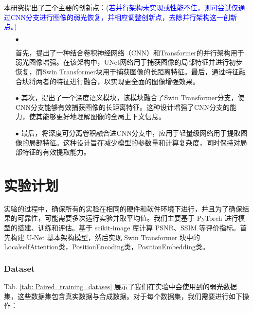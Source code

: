 \documentclass[a4paper, 10pt]{article}
\begin{document}
		本研究提出了三个主要的创新点：(\textcolor{blue}{若并行架构未实现或性能不佳，则可尝试仅通过CNN分支进行图像的弱光恢复，并相应调整创新点，去除并行架构这一创新点。})
		\begin{itemize}
			\item[$\bullet$]
			
			首先，提出了一种结合卷积神经网络（CNN）和Transformer的并行架构用于弱光图像增强。在该架构中，UNet网络用于捕获图像的局部特征并进行初步恢复，而Swin Transformer块用于捕获图像的长距离特征。最后，通过特征融合块将两者的特征进行融合，以实现更全面的图像增强效果。
			\item[$\bullet$] 
			其次，提出了一个深度语义模块，该模块融合了Swin Transformer分支，使CNN分支能够有效捕获图像的长距离特征。这种设计增强了CNN分支的能力，使其能够更好地理解图像的全局上下文信息。
			\item[$\bullet$]
			最后，将深度可分离卷积融合进CNN分支中，应用于轻量级网络用于提取图像的局部特征。这种设计旨在减少模型的参数量和计算复杂度，同时保持对局部特征的有效提取能力。
		\end{itemize}
		
		\section{实验计划}

		实验的过程中，确保所有的实验在相同的硬件和软件环境下进行，并且为了确保结果的可靠性，可能需要多次运行实验并取平均值。我们主要基于 PyTorch 进行模型的搭建、训练和评估。基于 scikit-image 库计算 PSNR、SSIM 等评价指标。首先构建 U-Net 基本架构模型，然后实现 Swin Transformer 块中的LocalselfAttention类，PositionEncoding类，PositionEmbedding类。

		\subsubsection{Dataset}
		
		Tab. \ref{tab: Paired_training_datases} 展示了我们在实验中会使用到的弱光数据集，这些数据集包含真实数据与合成数据。对于每个数据集，我们需要进行如下操作：
		
\end{document}
